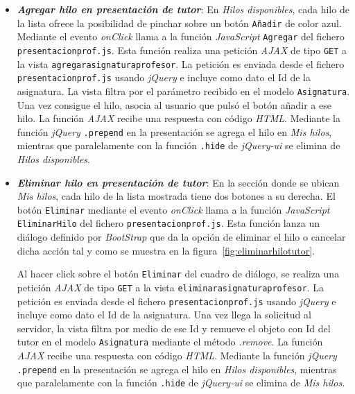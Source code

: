 \documentclass[a4paper, 12pt]{book}
\begin{document}
\begin{itemize}
  \item {\bfseries \textit{Agregar hilo en presentaci\'on de tutor}}: En \textit{Hilos disponibles}, cada hilo de la lista ofrece la posibilidad de pinchar 
  sobre un bot\'on \texttt{A\~nadir} de color azul. Mediante el evento \textit{onClick} llama a la funci\'on \textit{JavaScript} \texttt{Agregar} del 
  fichero \texttt{presentacionprof.js}. Esta funci\'on realiza una petici\'on \textit{AJAX} de tipo \texttt{GET} a la vista 
  \texttt{agregarasignaturaprofesor}. La petici\'on es enviada desde el fichero \texttt{presentacionprof.js} usando \textit{jQuery} e incluye como dato el 
  Id de la asignatura. La vista filtra por el par\'ametro recibido en el modelo \texttt{Asignatura}. Una vez consigue el hilo, asocia al usuario que 
  puls\'o el bot\'on a\~nadir a ese hilo. La funci\'on \textit{AJAX} recibe una respuesta con c\'odigo \textit{HTML}. Mediante la funci\'on \textit{jQuery} 
  \texttt{.prepend} en la presentaci\'on se agrega el hilo en \textit{Mis hilos}, mientras que paralelamente con la funci\'on \texttt{.hide} de 
  \textit{jQuery-ui} se elimina de \textit{Hilos disponibles}.

  \item {\bfseries \textit{Eliminar hilo en presentaci\'on de tutor}}: En la secci\'on donde se ubican \textit{Mis hilos}, cada hilo de la lista mostrada 
  tiene dos botones a su derecha. El bot\'on \texttt{Eliminar} mediante el evento \textit{onClick} llama a la funci\'on \textit{JavaScript} 
  \texttt{EliminarHilo} del fichero \texttt{presentacionprof.js}. Esta funci\'on lanza un di\'alogo definido por \textit{BootStrap} que da la opci\'on de
  eliminar el hilo o cancelar dicha acci\'on tal y como se muestra en la figura~\ref{fig:eliminarhilotutor}. 
  
  Al hacer click sobre el bot\'on \texttt{Eliminar} del cuadro de di\'alogo, se realiza una petici\'on \textit{AJAX} de tipo \texttt{GET} a la vista 
  \texttt{eliminarasignaturaprofesor}. La petici\'on es enviada desde el fichero \texttt{presentacionprof.js} usando \textit{jQuery} e incluye como dato el 
  Id de la asignatura. Una vez llega la solicitud al servidor, la vista filtra por medio de ese Id y remueve el objeto con Id del tutor en el modelo
  \texttt{Asignatura} mediante el m\'etodo \textit{.remove}. La funci\'on \textit{AJAX} recibe una respuesta con c\'odigo \textit{HTML}. Mediante la funci\'on 
  \textit{jQuery} \texttt{.prepend} en la presentaci\'on se agrega el hilo en \textit{Hilos disponibles}, mientras que paralelamente con la funci\'on 
  \texttt{.hide} de \textit{jQuery-ui} se elimina de \textit{Mis hilos}.
  

\end{itemize}
\end{document}
